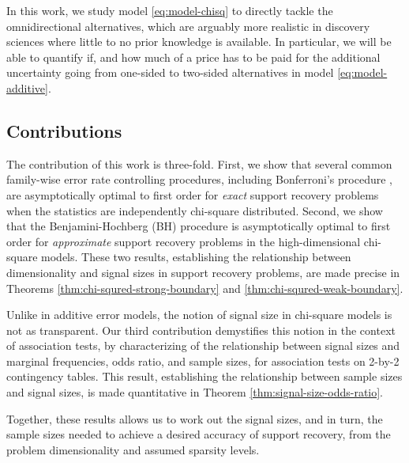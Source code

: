 In this work, we study model \eqref{eq:model-chisq} to directly tackle the omnidirectional alternatives, which are arguably more realistic in discovery sciences where little to no prior knowledge is available.
In particular, we will be able to quantify if, and how much of a price has to be paid for the additional uncertainty going from one-sided to two-sided alternatives in model \eqref{eq:model-additive}.

\subsection{Contributions}

The contribution of this work is three-fold.
First, we show that several common family-wise error rate controlling procedures, including Bonferroni's procedure \cite{dunn1961multiple}, are asymptotically optimal to first order for \emph{exact} support recovery problems when the statistics are independently chi-square distributed.
Second, we show that the Benjamini-Hochberg (BH) procedure \cite{benjamini1995controlling} is asymptotically optimal to first order for \emph{approximate} support recovery problems in the high-dimensional chi-square models.
These two results, establishing the relationship between dimensionality and signal sizes in support recovery problems, are made precise in Theorems \ref{thm:chi-squred-strong-boundary} and \ref{thm:chi-squred-weak-boundary}.

Unlike in additive error models, the notion of signal size in chi-square models is not as transparent.
Our third contribution demystifies this notion in the context of association tests, by characterizing of the relationship between signal sizes and marginal frequencies, odds ratio, and sample sizes, for association tests on 2-by-2 contingency tables.
This result, establishing the relationship between sample sizes and signal sizes, is made quantitative in Theorem \ref{thm:signal-size-odds-ratio}.

Together, these results allows us to work out the signal sizes, and in turn, the sample sizes needed to achieve a desired accuracy of support recovery, from the problem dimensionality and assumed sparsity levels.

